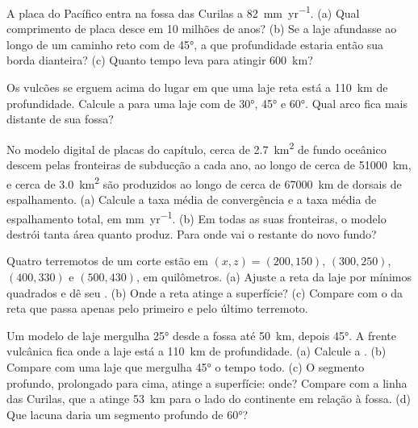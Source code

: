 \begin{exercise}[$\star$]\label{exo:b1:active-margins:2}
A placa do Pacífico entra na fossa das Curilas a \qty{82}{mm.yr^{-1}}. (a) Qual comprimento de placa desce em 10 milhões de anos? (b) Se a laje afundasse ao longo de um caminho reto com  de \ang{45}, a que profundidade estaria então sua borda dianteira? (c) Quanto tempo leva para atingir \qty{600}{km}?
\end{exercise}

\begin{exercise}[$\star$]\label{exo:b1:active-margins:3}
Os vulcões se erguem acima do lugar em que uma laje reta está a \qty{110}{km} de profundidade. Calcule a  para uma laje com  de \ang{30}, \ang{45} e \ang{60}. Qual arco fica mais distante de sua fossa?
\end{exercise}

\begin{exercise}[$\star$]\label{exo:b1:active-margins:4}
No modelo digital de placas do capítulo, cerca de \qty{2.7}{km^2} de fundo oceânico descem pelas fronteiras de subducção a cada ano, ao longo de cerca de \qty{51000}{km}, e cerca de \qty{3.0}{km^2} são produzidos ao longo de cerca de \qty{67000}{km} de dorsais de espalhamento. (a) Calcule a taxa média de convergência e a taxa média de espalhamento total, em \unit{mm.yr^{-1}}. (b) Em todas as suas fronteiras, o modelo destrói tanta área quanto produz. Para onde vai o restante do novo fundo?
\end{exercise}

\begin{exercise}[$\star\star$]\label{exo:b1:active-margins:5}
Quatro terremotos de um corte estão em $(x, z) = (200, 150)$, $(300, 250)$, $(400, 330)$ e $(500, 430)$, em quilômetros. (a) Ajuste a reta da laje por mínimos quadrados e dê seu . (b) Onde a reta atinge a superfície? (c) Compare com o  da reta que passa apenas pelo primeiro e pelo último terremoto.
\end{exercise}

\begin{exercise}[$\star\star$]\label{exo:b1:active-margins:6}
Um modelo de laje mergulha \ang{25} desde a fossa até \qty{50}{km}, depois \ang{45}. A frente vulcânica fica onde a laje está a \qty{110}{km} de profundidade. (a) Calcule a . (b) Compare com uma laje que mergulha \ang{45} o tempo todo. (c) O segmento profundo, prolongado para cima, atinge a superfície: onde? Compare com a linha das Curilas, que a atinge \qty{53}{km} para o lado do continente em relação à fossa. (d) Que lacuna daria um segmento profundo de \ang{60}?
\end{exercise}

